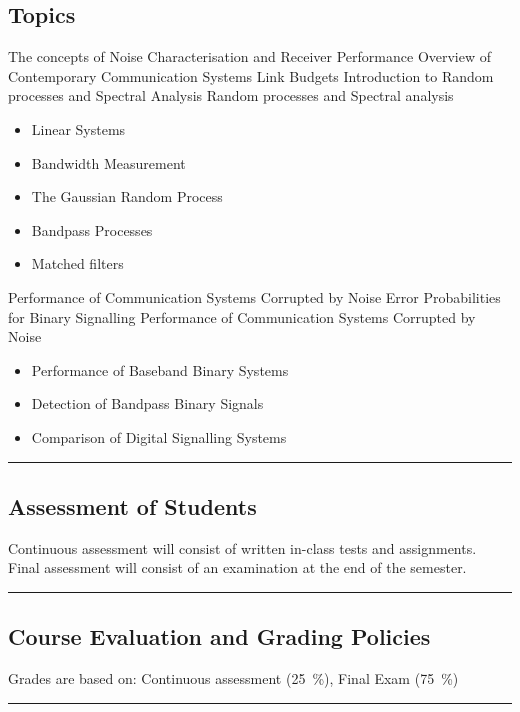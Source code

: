 \subsection*{Topics}
\begin{outline}
    \1 The concepts of Noise Characterisation and Receiver Performance
    \1 Overview of Contemporary Communication Systems Link Budgets
    \1 Introduction to Random processes and Spectral Analysis
    \1 Random processes and Spectral analysis
    \begin{itemize}
        \item  Linear Systems
        \item Bandwidth Measurement
        \item The Gaussian Random Process
        \item Bandpass Processes
        \item  Matched filters
    \end{itemize}
    \1 Performance of Communication Systems Corrupted by Noise Error Probabilities for Binary Signalling
    \1 Performance of Communication Systems Corrupted by Noise
    \begin{itemize}
        \item  Performance of Baseband Binary Systems
        \item Detection of Bandpass Binary Signals
        \item Comparison of Digital Signalling Systems
    \end{itemize}
\end{outline}
\vspace{2ex} \hrule\vspace{2ex}

\subsection*{Assessment of Students}
\begin{outline}
    \1 Continuous assessment will consist of written in-class tests and assignments.
    \1 Final assessment will consist of an examination at the end of the semester.
\end{outline}
\vspace{2ex}\hrule\vspace{2ex}

\subsection*{Course Evaluation and Grading Policies}
Grades are based on:
Continuous assessment (\qty{25}{\percent}),
Final Exam (\qty{75}{\percent})
\vspace{2ex}\hrule\vspace{2ex}

